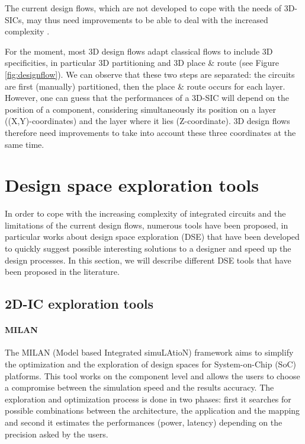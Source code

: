 The current design flows, which are not developed to cope with the needs of 3D-SICs, may thus need improvements to be able to deal with the increased complexity \cite{vanderbiest06, PFF10}.

For the moment, most 3D design flows adapt classical flows to include 3D specificities, in particular 3D partitioning and 3D place \& route (see Figure \ref{fig:designflow}). We can observe that these two steps are separated: the circuits are first (manually) partitioned, then the place \& route occurs for each layer. However, one can guess that the performances of a 3D-SIC will depend on the position of a component, considering simultaneously its position on a layer ((X,Y)-coordinates) and the layer where it lies (Z-coordinate). 3D design flows therefore need improvements to take into account these three coordinates at the same time.

\section{Design space exploration tools}

In order to cope with the increasing complexity of integrated circuits and the limitations of the current design flows, numerous tools have been proposed, in particular works about design space exploration (DSE) that have been developed to quickly suggest possible interesting solutions to a designer and speed up the design processes. In this section, we will describe different DSE tools that have been proposed in the literature.

\subsection{2D-IC exploration tools}

\paragraph{MILAN}

The MILAN (Model based Integrated simuLAtioN) framework \cite{Mohanty02rapidsystem-level} aims to simplify the optimization and the exploration of design spaces for System-on-Chip (SoC) platforms. This tool works on the component level and allows the users to choose a compromise between the simulation speed and the results accuracy. The exploration and optimization process is done in two phases: first it searches for possible combinations between the architecture, the application and the mapping and second it estimates the performances (power, latency) depending on the precision asked by the users.

